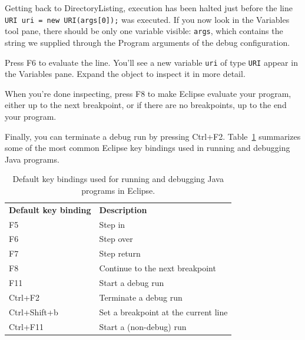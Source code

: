 \documentclass[12pt, a4paper, twoside, openany, titlepage]{book}
\begin{document}
Getting back to \textsf{DirectoryListing}, execution has been halted just before the line \texttt{URI uri = new URI(args[0]);} was executed. If you now look in the \textsf{Variables} tool pane, there should be only one variable visible: \texttt{args}, which contains the string we supplied through the \textsf{Program arguments} of the debug configuration.

Press \textsf{F6} to evaluate the line. You'll see a new variable \texttt{uri} of type \texttt{URI} appear in the \textsf{Variables} pane. Expand the object to inspect it in more detail.

When you're done inspecting, press \textsf{F8} to make Eclipse evaluate your program, either up to the next breakpoint, or if there are no breakpoints, up to the end your program.

Finally, you can terminate a debug run by pressing \textsf{Ctrl+F2}. Table~\ref{tab:key-bindings-eclipse} summarizes some of the most common Eclipse key bindings used in running and debugging Java programs.


\begin{table}[!ht]
\vspace{1.0em}
\caption{Default key bindings used for running and debugging Java programs in Eclipse.\label{tab:key-bindings-eclipse}}
\begin{tabular}{lp{10cm}}
\vspace{0.5em}
\textbf{Default key binding} & \textbf{Description}                  \\
\textsf{F5}                  & Step in                               \\
\textsf{F6}                  & Step over                             \\
\textsf{F7}                  & Step return                           \\
\textsf{F8}                  & Continue to the next breakpoint       \\
\textsf{F11}                 & Start a debug run                     \\
\textsf{Ctrl+F2}             & Terminate a debug run                 \\
\textsf{Ctrl+Shift+b}        & Set a breakpoint at the current line  \\
\textsf{Ctrl+F11}            & Start a (non-debug) run               \\
\end{tabular}
\end{table}
\end{document}
